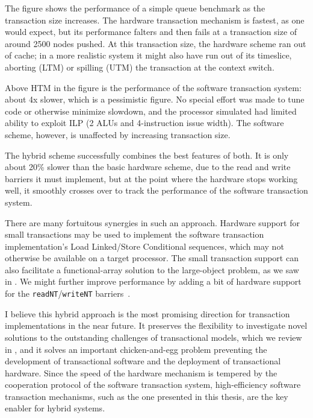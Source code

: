 The figure shows the performance of a simple queue benchmark as the
transaction size increases.  The hardware transaction mechanism is
fastest, as one would expect, but its performance falters and then
fails at a transaction size of around 2500 nodes pushed.  At this
transaction size, the hardware scheme ran out of cache; in a
more realistic system it might also have run out of its timeslice,
aborting (LTM) or spilling (UTM) the transaction at the context
switch.

Above HTM in the figure is the performance of the software transaction
system: about 4x slower, which is a pessimistic figure.  No
special effort was made to tune code or otherwise minimize slowdown,
and the processor simulated had limited ability to exploit ILP (2 ALUs
and 4-instruction issue width).  The software scheme, however, is unaffected by
increasing transaction size.

The hybrid scheme successfully combines the best features of both.  It
is only about 20\% slower than the basic hardware scheme, due to the
read and write barriers it must implement, but at the point where the
hardware stops working well, it smoothly crosses over to track the
performance of the software transaction system.

There are many fortuitous synergies in such an approach.  
Hardware support for small transactions may
be used to implement the software transaction implementation's
Load Linked/Store Conditional sequences, which may not
otherwise be available on a target processor.
The small transaction support can also facilitate a functional-array
solution to the large-object problem, as we saw in
.  We might further improve performance by adding a
bit of hardware support for the \texttt{readNT}/\texttt{writeNT}
barriers~\cite{ClickTeWo05}.

I believe this hybrid approach is the most promising direction for
transaction implementations in the near future.  It preserves the
flexibility to investigate novel solutions to the outstanding challenges of
transactional models, which we review in , and it
solves an important chicken-and-egg problem preventing the development
of transactional software and the deployment of transactional
hardware.  Since the speed of the hardware mechanism is tempered by
the cooperation protocol of the software transaction system,
high-efficiency software transaction mechanisms, such as the one
presented in this thesis, are the key enabler for hybrid systems.
